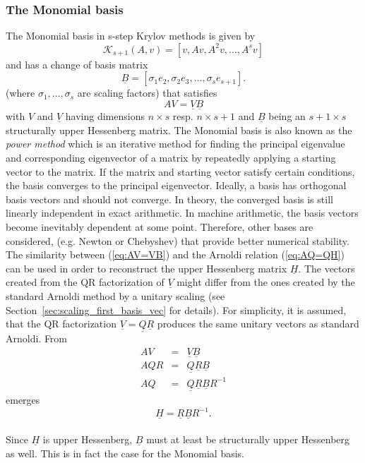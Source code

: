 \documentclass{scrartcl}
\numberwithin{equation}{section}
\begin{document}
\subsubsection{The Monomial basis}
The Monomial basis in s-step Krylov methods is given by 
\begin{equation*}
\mathcal{K}_{s + 1}(A, v) = [v, Av, A^2v, \ldots, A^sv]
\end{equation*}
and has a change of basis matrix
\begin{equation*}
\underline{B} = [\sigma_1 e_2, \sigma_2 e_3, \ldots, \sigma_s e_{s + 1}].
\end{equation*}
(where $\sigma_1, \ldots, \sigma_s$ are scaling factors) that satisfies
\begin{equation} \label{eq:AV=VB}
AV = \underline{V} \underline{B}
\end{equation}
with $V$ and $\underline{V}$ having dimensions $n \times s$ resp. $n \times s + 1$ and $\underline{B}$ being an $s + 1 \times s$ structurally upper Hessenberg matrix.
The Monomial basis is also known as the \textit{power method} which is an iterative method for finding the principal eigenvalue and corresponding eigenvector of a matrix by repeatedly applying a starting vector to the matrix. If the matrix and starting vector satisfy certain conditions, the basis converges to the principal eigenvector. Ideally, a basis has orthogonal basis vectors and should not converge. In theory, the converged basis is still linearly independent in exact arithmetic. In machine arithmetic, the basis vectors become inevitably dependent at some point. Therefore, other bases are considered, (e.g. Newton or Chebyshev) that provide better numerical stability.\\

The similarity between (\ref{eq:AV=VB}) and the Arnoldi relation (\ref{eq:AQ=QH}) can be used in order to reconstruct the upper Hessenberg matrix $\underline{H}$. The vectors created from the QR factorization of $\underline{V}$ might differ from the ones created by the standard Arnoldi method by a unitary scaling (see Section~\ref{sec:scaling_first_basis_vec} for details). For simplicity, it is assumed, that the QR factorization $\underline{V} = \underline{Q} \underline{R}$ produces the same unitary vectors as standard Arnoldi. From
\begin{eqnarray} \label{eq:unitary_scaling}
	AV &=& \underline{V} \underline{B} \nonumber\\
	AQR &=& \underline{Q} \underline{R} \underline{B} \nonumber\\
	AQ &=& \underline{Q} \underline{R} \underline{B} R^{-1}
\end{eqnarray}
emerges
\begin{equation} \label{eq:H=RBR}
	\underline{H} = \underline{R} \underline{B} R^{-1}.
\end{equation}
\\
Since $\underline{H}$ is upper Hessenberg, $\underline{B}$ must at least be structurally upper Hessenberg as well. This is in fact the case for the Monomial basis.
\end{document}
